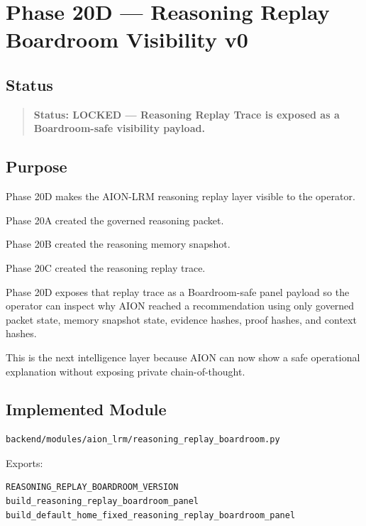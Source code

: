 \section{Phase 20D --- Reasoning Replay Boardroom Visibility v0}
\label{sec:phase20d-reasoning-replay-boardroom-visibility-v0}

\subsection{Status}

\begin{quote}
\textbf{Status: LOCKED --- Reasoning Replay Trace is exposed as a Boardroom-safe visibility payload.}
\end{quote}

\subsection{Purpose}

Phase 20D makes the AION-LRM reasoning replay layer visible to the operator.

Phase 20A created the governed reasoning packet.

Phase 20B created the reasoning memory snapshot.

Phase 20C created the reasoning replay trace.

Phase 20D exposes that replay trace as a Boardroom-safe panel payload so the operator can inspect why AION reached a recommendation using only governed packet state, memory snapshot state, evidence hashes, proof hashes, and context hashes.

This is the next intelligence layer because AION can now show a safe operational explanation without exposing private chain-of-thought.

\subsection{Implemented Module}

\begin{verbatim}
backend/modules/aion_lrm/reasoning_replay_boardroom.py
\end{verbatim}

Exports:

\begin{verbatim}
REASONING_REPLAY_BOARDROOM_VERSION
build_reasoning_replay_boardroom_panel
build_default_home_fixed_reasoning_replay_boardroom_panel
\end{verbatim}

